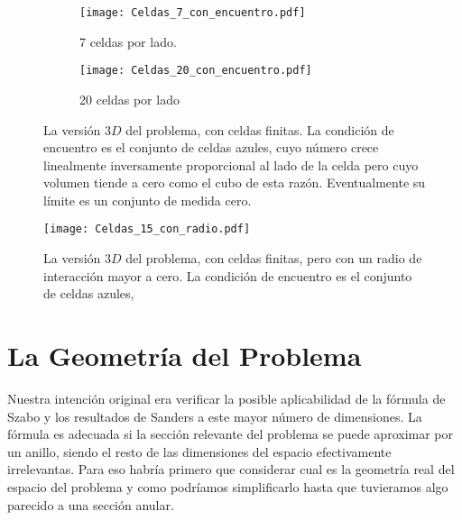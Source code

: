 \documentclass[letterpaperr,12pt]{article}
\begin{document}
\begin{figure}[h]
  \centering
  \begin{subfigure}[b]{0.49\textwidth}
    \centering
    \texttt{[image: Celdas\_7\_con\_encuentro.pdf]}
    \caption{7 celdas por lado.}
    \label{gruesaceldas}
  \end{subfigure}
  \begin{subfigure}[b]{0.49\textwidth}
    \centering
    \texttt{[image: Celdas\_20\_con\_encuentro.pdf]}
    \caption{20 celdas por lado}
    \label{finaceldas}
  \end{subfigure}
  \caption{La versión $3D$ del problema, con celdas finitas. 
La condición de encuentro es el conjunto de celdas azules, cuyo
número crece linealmente inversamente proporcional al lado de la celda pero
cuyo volumen tiende a cero como el cubo de esta razón. Eventualmente 
su límite es un conjunto de medida cero.}\label{celdas3d}
\end{figure}


\begin{figure}[h]
  \centering
   \texttt{[image: Celdas\_15\_con\_radio.pdf]}
   \caption{La versión $3D$ del problema, con celdas finitas, pero
con un radio de interacción mayor a cero. 
La condición de encuentro es el conjunto de celdas azules, }\label{celdas3dconradio}
\end{figure}


\section{La Geometría del Problema}

Nuestra intención original era verificar la posible aplicabilidad de la
fórmula de Szabo \cite{Szabo80} y los resultados de Sanders \cite{SandersLuca}
a este mayor número de dimensiones. La fórmula es adecuada si la sección
relevante del problema se puede aproximar por un anillo, 
siendo el resto de las dimensiones del espacio efectivamente 
irrelevantas. Para eso habría primero que considerar cual es 
la geometría real del espacio del problema y como podríamos simplificarlo
hasta que tuvieramos algo parecido a una sección anular.
\end{document}
